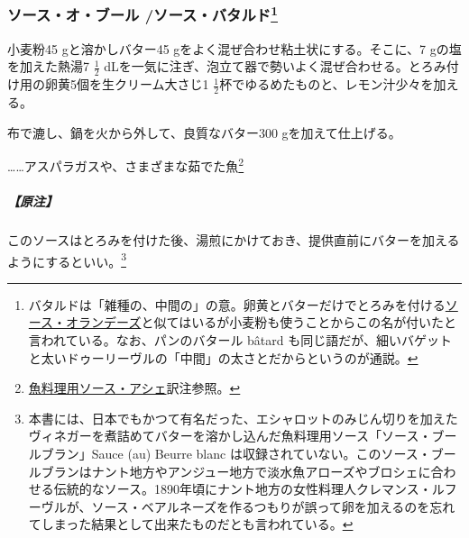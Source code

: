 \begin{recette}
\atoaki{}

\hypertarget{sauce-au-beurre}{%
\subsubsection[ソース・オ・ブール
/ソース・バタルド]{\texorpdfstring{ソース・オ・ブール
/ソース・バタルド\footnote{バタルドは「雑種の、中間の」の意。卵黄とバターだけでとろみを付ける\protect\hyperlink{sauce-hollandaise}{ソース・オランデーズ}と似てはいるが小麦粉も使うことからこの名が付いたと言われている。なお、パンのバタール
  bâtard
  も同じ語だが、細いバゲットと太いドゥーリーヴルの「中間」の太さとだからというのが通説。}}{ソース・オ・ブール /ソース・バタルド}}\label{sauce-au-beurre}}


 
 

小麦粉45 gと溶かしバター45 gをよく混ぜ合わせ粘土状にする。そこに、7
gの塩を加えた熱湯7 \(\frac{1}{2}\)
dLを一気に注ぎ、泡立て器で勢いよく混ぜ合わせる。とろみ付け用の卵黄5個を生クリーム大さじ1
\(\frac{1}{2}\)杯でゆるめたものと、レモン汁少々を加える。

布で漉し、鍋を火から外して、良質なバター300 gを加えて仕上げる。

\ldots{}\ldots{}アスパラガスや、さまざまな茹でた魚\footnote{\protect\hyperlink{sauce-hachee-maigre}{魚料理用ソース・アシェ}訳注参照。}

\hypertarget{nota-sauce-au-beurre}{%
\subparagraph{【原注】}\label{nota-sauce-au-beurre}}

このソースはとろみを付けた後、湯煎にかけておき、提供直前にバターを加えるようにするといい。\footnote{本書には、日本でもかつて有名だった、エシャロットのみじん切りを加えたヴィネガーを煮詰めてバターを溶かし込んだ魚料理用ソース「ソース・ブールブラン」Sauce
  (au) Beurre blanc
  は収録されていない。このソース・ブールブランはナント地方やアンジュー地方で淡水魚アローズやブロシェに合わせる伝統的なソース。1890年頃にナント地方の女性料理人クレマンス・ルフーヴルが、ソース・ベアルネーズを作るつもりが誤って卵を加えるのを忘れてしまった結果として出来たものだとも言われている。}


\end{recette}
